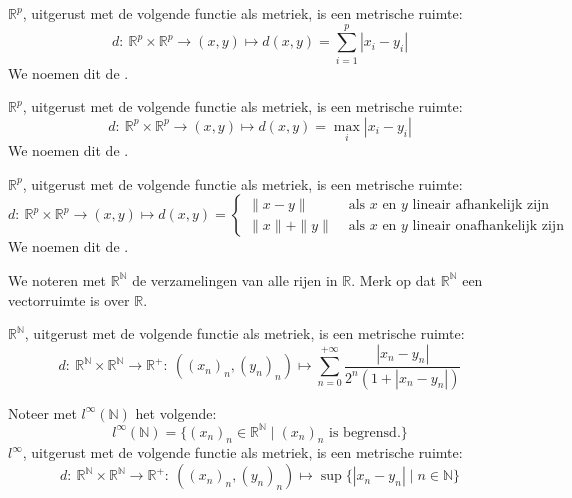 \documentclass[main.tex]{subfiles}
\begin{document}
\begin{vb}
  $\mathbb{R}^{p}$, uitgerust met de volgende functie als metriek, is een metrische ruimte:
  \[ d:\ \mathbb{R}^{p}\times\mathbb{R}^{p}\rightarrow (x,y) \mapsto d(x,y)=\sum_{i=1}^{p}|x_{i}-y_{i}| \]
  We noemen dit de .
\end{vb}

\begin{vb}
  $\mathbb{R}^{p}$, uitgerust met de volgende functie als metriek, is een metrische ruimte:
  \[ d:\ \mathbb{R}^{p}\times\mathbb{R}^{p}\rightarrow (x,y) \mapsto d(x,y)=\max_{i}|x_{i}-y_{i}| \]
  We noemen dit de .
\end{vb}

\begin{vb}
  $\mathbb{R}^{p}$, uitgerust met de volgende functie als metriek, is een metrische ruimte:
  \[
  d:\ \mathbb{R}^{p}\times\mathbb{R}^{p}\rightarrow (x,y) \mapsto d(x,y)=
  \begin{cases}
    \|x-y\| &\text{ als $x$ en $y$ lineair afhankelijk zijn}\\
    \|x\|+\|y\| &\text{ als $x$ en $y$ lineair onafhankelijk zijn}
  \end{cases}
  \]
  We noemen dit de .
\end{vb}

\begin{de}
  We noteren met $\mathbb{R}^{\mathbb{N}}$ de verzamelingen van alle rijen in $\mathbb{R}$.
  Merk op dat $\mathbb{R}^{\mathbb{N}}$ een vectorruimte is over $\mathbb{R}$.
\end{de}

\begin{vb}
  $\mathbb{R}^{\mathbb{N}}$, uitgerust met de volgende functie als metriek, is een metrische ruimte:
  \[ d:\ \mathbb{R}^{\mathbb{N}} \times \mathbb{R}^{\mathbb{N}} \rightarrow \mathbb{R}^{+}:\ ((x_{n})_{n},(y_{n})_{n}) \mapsto \sum_{n=0}^{+\infty}\frac{|x_{n}-y_{n}|}{2^{n}(1+|x_{n}-y_{n}|)} \]
\end{vb}

\begin{vb}
  Noteer met $l^{\infty}(\mathbb{N})$ het volgende:
  \[ l^{\infty}(\mathbb{N}) = \{ (x_{n})_{n} \in \mathbb{R}^{\mathbb{N}} \mid (x_{n})_{n} \text{ is begrensd.}\} \]
  $l^{\infty}$, uitgerust met de volgende functie als metriek, is een metrische ruimte:
  \[ d:\ \mathbb{R}^{\mathbb{N}} \times \mathbb{R}^{\mathbb{N}} \rightarrow \mathbb{R}^{+}:\ ((x_{n})_{n},(y_{n})_{n}) \mapsto \sup\{|x_{n}-y_{n}| \mid n\in \mathbb{N}\} \]
\end{vb}
\end{document}
